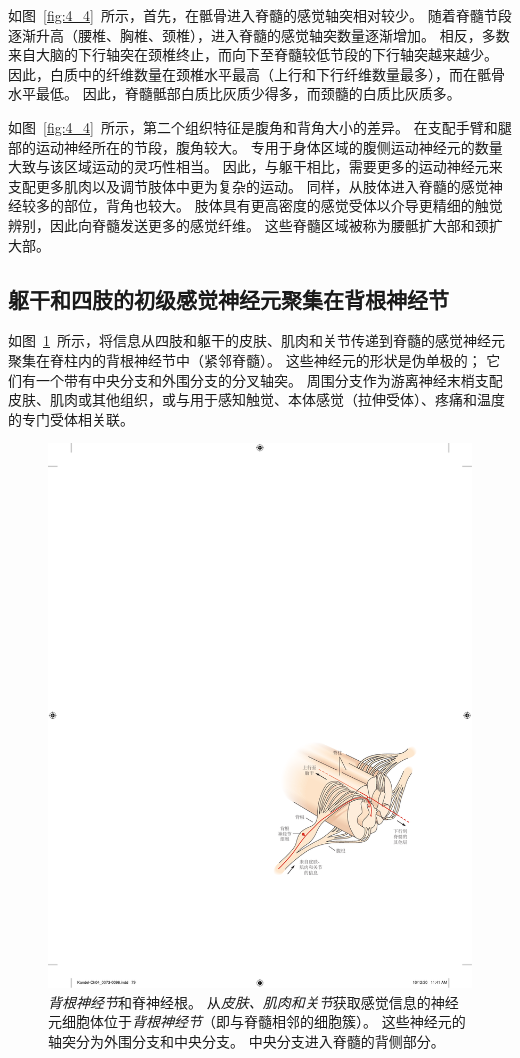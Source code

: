 如图~\ref{fig:4_4}~所示，首先，在骶骨进入脊髓的感觉轴突相对较少。
随着脊髓节段逐渐升高（腰椎、胸椎、颈椎），进入脊髓的感觉轴突数量逐渐增加。
相反，多数来自大脑的下行轴突在颈椎终止，而向下至脊髓较低节段的下行轴突越来越少。
因此，白质中的纤维数量在颈椎水平最高（上行和下行纤维数量最多），而在骶骨水平最低。
因此，脊髓骶部白质比灰质少得多，而颈髓的白质比灰质多。


如图~\ref{fig:4_4}~所示，第二个组织特征是腹角和背角大小的差异。
在支配手臂和腿部的运动神经所在的节段，腹角较大。
专用于身体区域的腹侧运动神经元的数量大致与该区域运动的灵巧性相当。
因此，与躯干相比，需要更多的运动神经元来支配更多肌肉以及调节肢体中更为复杂的运动。
同样，从肢体进入脊髓的感觉神经较多的部位，背角也较大。
肢体具有更高密度的感觉受体以介导更精细的触觉辨别，因此向脊髓发送更多的感觉纤维。
这些脊髓区域被称为腰骶扩大部和颈扩大部。



\subsection{躯干和四肢的初级感觉神经元聚集在背根神经节}

如图~\ref{fig:4_5}~所示，将信息从四肢和躯干的皮肤、肌肉和关节传递到脊髓的感觉神经元聚集在脊柱内的背根神经节中（紧邻脊髓）。
这些神经元的形状是伪单极的；
它们有一个带有中央分支和外围分支的分叉轴突。
周围分支作为游离神经末梢支配皮肤、肌肉或其他组织，或与用于感知触觉、本体感觉（拉伸受体）、疼痛和温度的专门受体相关联。


\begin{figure}[htbp]
	\centering
	\includegraphics[width=0.65\linewidth]{chap04/fig_4_5}
	\caption{\textit{背根神经节}和脊神经根。
		从\textit{皮肤、肌肉和关节}获取感觉信息的神经元细胞体位于\textit{背根神经节}（即与脊髓相邻的细胞簇）。
		这些神经元的轴突分为外围分支和中央分支。
		中央分支进入脊髓的背侧部分。}
	\label{fig:4_5}
\end{figure}


